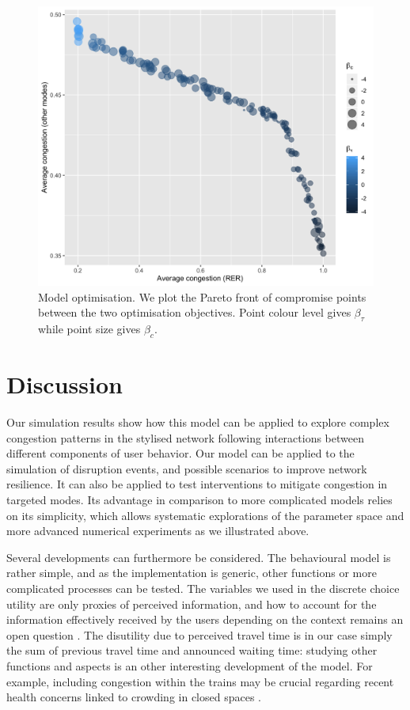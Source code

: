 \documentclass[3p,times,procedia]{elsarticle}
\begin{document}
\begin{figure}%
\centerline{\includegraphics[width=0.75\linewidth]{figures/Fig4.png}}
\caption{Model optimisation. We plot the Pareto front of compromise points between the two optimisation objectives. Point colour level gives $\beta_{\tau}$ while point size gives $\beta_c$.\label{fig:fig4}}
\end{figure}

\section{Discussion}


Our simulation results show how this model can be applied to explore complex congestion patterns in the stylised network following interactions between different components of user behavior. Our model can be applied to the simulation of disruption events, and possible scenarios to improve network resilience. It can also be applied to test interventions to mitigate congestion in targeted modes. Its advantage in comparison to more complicated models relies on its simplicity, which allows systematic explorations of the parameter space and more advanced numerical experiments as we illustrated above.

Several developments can furthermore be considered. The behavioural model is rather simple, and as the implementation is generic, other functions or more complicated processes can be tested. The variables we used in the discrete choice utility are only proxies of perceived information, and how to account for the information effectively received by the users depending on the context remains an open question \citep{gao2018trip}. The disutility due to perceived travel time is in our case simply the sum of previous travel time and announced waiting time: studying other functions and aspects is an other interesting development of the model. For example, including congestion within the trains may be crucial regarding recent health concerns linked to crowding in closed spaces \citep{raimbault2021estimating}.
\end{document}
